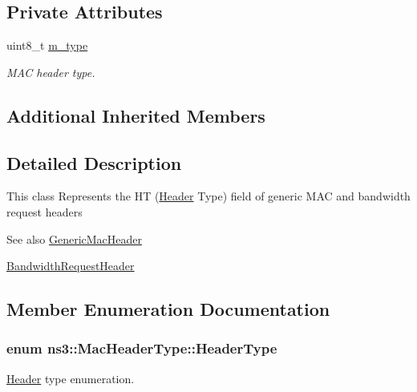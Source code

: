 \subsection*{Private Attributes}
\begin{DoxyCompactItemize}
\item 
uint8\+\_\+t \hyperlink{classns3_1_1MacHeaderType_a20a811c2c0b8fa820f289ef3c578cb83}{m\+\_\+type}
\begin{DoxyCompactList}\small\item\em M\+AC header type. \end{DoxyCompactList}\end{DoxyCompactItemize}
\subsection*{Additional Inherited Members}


\subsection{Detailed Description}
This class Represents the HT (\hyperlink{classns3_1_1Header}{Header} Type) field of generic M\+AC and bandwidth request headers \begin{DoxySeeAlso}{See also}
\hyperlink{classns3_1_1GenericMacHeader}{Generic\+Mac\+Header} 

\hyperlink{classns3_1_1BandwidthRequestHeader}{Bandwidth\+Request\+Header} 
\end{DoxySeeAlso}


\subsection{Member Enumeration Documentation}
\subsubsection[{\texorpdfstring{Header\+Type}{HeaderType}}]{\setlength{\rightskip}{0pt plus 5cm}enum {\bf ns3\+::\+Mac\+Header\+Type\+::\+Header\+Type}}\hypertarget{classns3_1_1MacHeaderType_a54d8fc8bc93a2b7865627965cdd31c20}{}\label{classns3_1_1MacHeaderType_a54d8fc8bc93a2b7865627965cdd31c20}


\hyperlink{classns3_1_1Header}{Header} type enumeration. 

